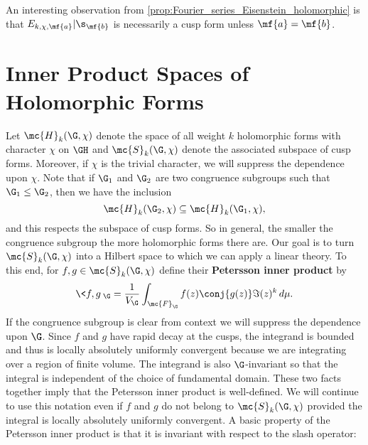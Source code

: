     An interesting observation from \cref{prop:Fourier_series_Eisenstein_holomorphic} is that $E_{k,\chi,\mf{a}}|\s_{\mf{b}}$ is necessarily a cusp form unless $\mf{a} = \mf{b}$.
  \section{Inner Product Spaces of Holomorphic Forms}
    Let $\mc{H}_{k}(\G,\chi)$ denote the space of all weight $k$ holomorphic forms with character $\chi$ on $\GH$ and $\mc{S}_{k}(\G,\chi)$ denote the associated subspace of cusp forms. Moreover, if $\chi$ is the trivial character, we will suppress the dependence upon $\chi$. Note that if $\G_{1}$ and $\G_{2}$ are two congruence subgroups such that $\G_{1} \le \G_{2}$, then we have the inclusion
    \[
      \mc{H}_{k}(\G_{2},\chi) \subseteq \mc{H}_{k}(\G_{1},\chi),
    \]
    and this respects the subspace of cusp forms. So in general, the smaller the congruence subgroup the more holomorphic forms there are. Our goal is to turn $\mc{S}_{k}(\G,\chi)$ into a Hilbert space to which we can apply a linear theory. To this end, for $f,g \in \mc{S}_{k}(\G,\chi)$ define their \textbf{Petersson inner product} by
    \[
      \<f,g\>_{\G} = \frac{1}{V_{\G}}\int_{\mc{F}_{\G}}f(z)\conj{g(z)}\Im(z)^{k}\,d\mu.
    \]
    If the congruence subgroup is clear from context we will suppress the dependence upon $\G$. Since $f$ and $g$ have rapid decay at the cusps, the integrand is bounded and thus is locally absolutely uniformly convergent because we are integrating over a region of finite volume. The integrand is also $\G$-invariant so that the integral is independent of the choice of fundamental domain. These two facts together imply that the Petersson inner product is well-defined. We will continue to use this notation even if $f$ and $g$ do not belong to $\mc{S}_{k}(\G,\chi)$ provided the integral is locally absolutely uniformly convergent. A basic property of the Petersson inner product is that it is invariant with respect to the slash operator:

